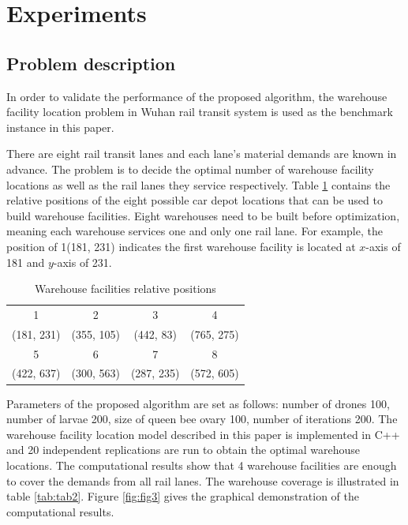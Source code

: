 \section{Experiments}
\subsection{Problem description}
In order to validate the performance of the proposed algorithm, the warehouse facility location problem in Wuhan rail transit system is used as the benchmark instance in this paper.

There are eight rail transit lanes and each lane's material demands are known in advance.
The problem is to decide the optimal number of warehouse facility locations as well as the rail lanes they service respectively.
Table \ref{tab:tab1} contains the relative positions of the eight possible car depot locations that can be used to build warehouse facilities.
Eight warehouses need to be built before optimization, meaning each warehouse services one and only one rail lane.
For example, the position of 1(181, 231) indicates the first warehouse facility is located at $x$-axis of 181 and $y$-axis of 231.

\begin{table}[h!]
	\begin{center}
		\caption{Warehouse facilities relative positions}
		\label{tab:tab1}
		\begin{tabular}{cccc}
			\hline
			1 & 2 & 3 & 4 \\
			(181, 231) & (355, 105) & (442, 83) & (765, 275) \\
			\hline
			5 & 6 & 7 & 8 \\ 
			(422, 637) & (300, 563) & (287, 235) & (572, 605)\\
			\hline
		\end{tabular}
	\end{center}
\end{table}

Parameters of the proposed algorithm are set as follows: number of drones 100, number of larvae 200, size of queen bee ovary 100, number of iterations 200.
The warehouse facility location model described in this paper is implemented in C++ and 20 independent replications are run to obtain the optimal warehouse locations.
The computational results show that 4 warehouse facilities are enough to cover the demands from all rail lanes.
The warehouse coverage is illustrated in table \ref{tab:tab2}.
Figure \ref{fig:fig3} gives the graphical demonstration of the computational results.

